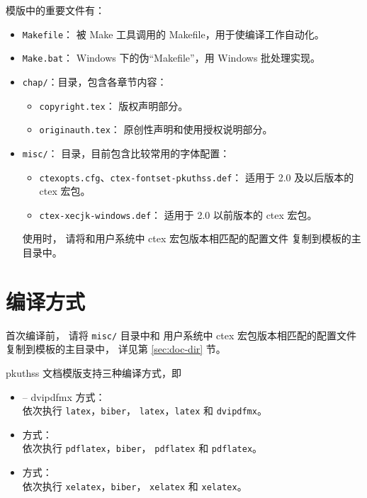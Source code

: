 	模版中的重要文件有：
	\begin{itemize}
		\item \verb|Makefile|：
			被 Make 工具调用的 Makefile，用于使编译工作自动化。
		\item \verb|Make.bat|：%
			Windows 下的伪“Makefile”，用 Windows 批处理实现。

		\item \verb|chap/|：目录，包含各章节内容：
		\begin{itemize}
			\item \verb|copyright.tex|：
				版权声明部分。
			\item \verb|originauth.tex|：
				原创性声明和使用授权说明部分\supercite{pku-originauth}。
		\end{itemize}

		\item \verb|misc/|：
			目录，目前包含比较常用的字体配置：
		\begin{itemize}
			\item \verb|ctexopts.cfg|、\verb|ctex-fontset-pkuthss.def|：
				适用于 2.0 及以后版本的 ctex\supercite{ctex} 宏包。
			\item \verb|ctex-xecjk-windows.def|：
				适用于 2.0 以前版本的 ctex 宏包。
		\end{itemize}
		使用时，
		请将和用户系统中 ctex 宏包版本相匹配的配置文件
		复制到模板的主目录中。
	\end{itemize}

	\section{编译方式}\label{sec:compile}

	首次编译前，
	请将 \verb|misc/| 目录中和
	用户系统中 ctex 宏包版本相匹配的配置文件复制到模板的主目录中，
	详见第 \ref{sec:doc-dir} 节。

	pkuthss 文档模版支持三种编译方式，即
	\begin{itemize}
		\item {} -- dvipdfmx 方式：\\
			依次执行 \verb|latex|，\verb|biber|，%
			\verb|latex|，\verb|latex| 和 \verb|dvipdfmx|。
		\item {} 方式：\\
			依次执行 \verb|pdflatex|，\verb|biber|，%
			\verb|pdflatex| 和 \verb|pdflatex|。
		\item {} 方式：\\
			依次执行 \verb|xelatex|，\verb|biber|，%
			\verb|xelatex| 和 \verb|xelatex|。
	\end{itemize}

